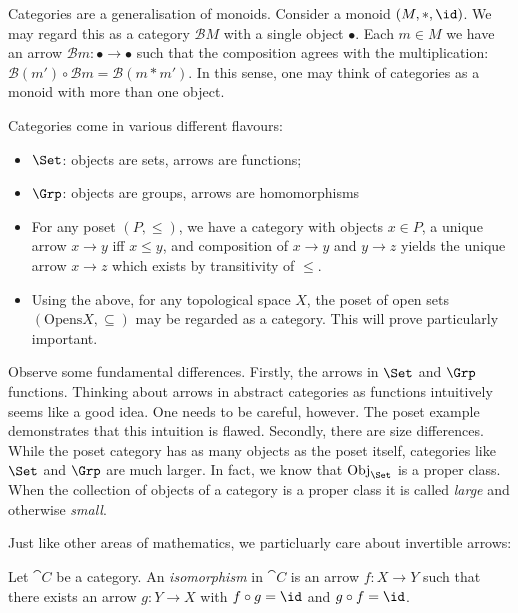 \documentclass{article}
\begin{document}
Categories are a generalisation of monoids. Consider a monoid $(M,*,\id)$. We
may regard this as a category $\mathcal B M$ with a single object $\bullet$.
Each $m\in M$ we have an arrow $\mathcal B m:\bullet\to\bullet$ such that the
composition agrees with the multiplication: $\mathcal B(m')\circ\mathcal Bm =
\mathcal B(m * m')$. In this sense, one may think of categories as a monoid
with more than one object. 

\begin{example}
  Categories come in various different flavours:
  \begin{itemize}
    \item $\Set$: objects are sets, arrows are functions;
    \item $\Grp$: objects are groups, arrows are homomorphisms
    \item For any poset $(P,\leq)$, we have a category with objects $x\in P$,
      a unique arrow $x\to y$ iff $x\leq y$, and composition of $x\to y$ and
      $y\to z$ yields the unique arrow $x\to z$ which exists by transitivity
      of $\leq$.
    \item Using the above, for any topological space $X$, the poset of open sets
      $(\text{Opens}X, \subseteq)$ may be regarded as a category. This will prove
      particularly important.
  \end{itemize}
\end{example}


Observe some fundamental differences. Firstly, the arrows in $\Set$ and $\Grp$
functions. Thinking about arrows in abstract categories as functions
intuitively seems like a good idea. One needs to be careful, however. The poset
example demonstrates that this intuition is flawed. Secondly, there are size
differences. While the poset category has as many objects as the poset itself,
categories like $\Set$ and $\Grp$ are much larger. In fact, we know that
$\Obj_{\Set}$ is a proper class. When the collection of objects of a category
is a proper class it is called \emph{large} and otherwise \emph{small}.

Just like other areas of mathematics, we particluarly care about invertible
arrows:

\begin{definition}
  Let $\cat{C}$ be a category. An \emph{isomorphism} in $\cat{C}$ is an arrow
  $f:X\to Y$ such that there exists an arrow $g:Y\to X$ with $f\circ g = \id$
  and $g\circ f = \id$.
\end{definition}
\end{document}

